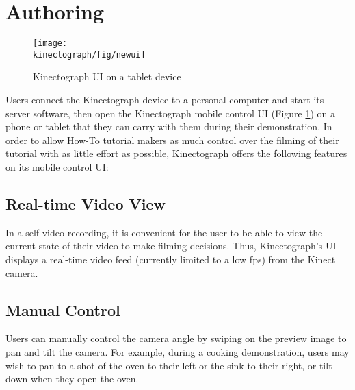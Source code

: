 \section{Authoring}
\label{kinectograph_authoring}

\begin{figure}[t]
\centering
\texttt{[image: \\kinectograph/fig/newui]}
\caption{Kinectograph UI on a tablet device}
\label{fig:figure4}
\end{figure}

Users connect the Kinectograph device to a personal computer and start its server software, then open the Kinectograph mobile control UI (Figure \ref{fig:figure4}) on a phone or tablet that they can carry with them during their demonstration.
%
In order to allow How-To tutorial makers as much control over the filming of their tutorial with as little effort as possible, Kinectograph offers the following features on its mobile control UI:

\subsection{Real-time Video View}
In a self video recording, it is convenient for the user to be able to view the current state of their video to make filming decisions. Thus, Kinectograph's UI displays a real-time video feed (currently limited to a low fps) from the Kinect camera.

\subsection{Manual Control}
Users can manually control the camera angle by swiping on the preview image to pan and tilt the camera. For example, during a cooking demonstration, users may wish to pan to a shot of the oven to their left or the sink to their right, or tilt down when they open the oven.

